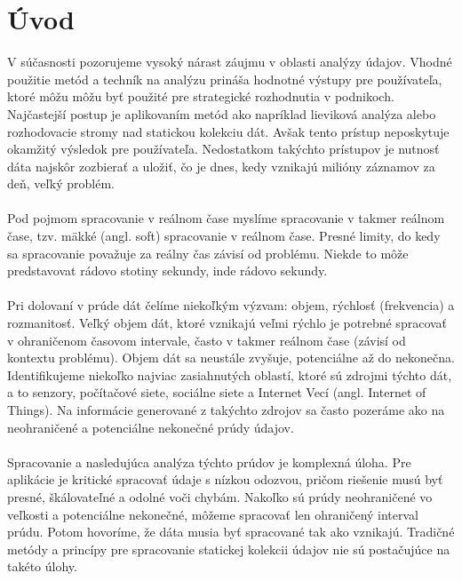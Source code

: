 %

\chapter{Úvod}
V súčasnosti pozorujeme vysoký nárast záujmu v oblasti analýzy údajov. Vhodné použitie metód a techník na analýzu prináša hodnotné výstupy pre používateľa, ktoré môžu môžu byť použité pre strategické rozhodnutia v podnikoch. Najčastejší postup je aplikovaním metód ako napríklad lieviková analýza alebo rozhodovacie stromy nad statickou kolekciu dát. Avšak tento prístup neposkytuje okamžitý výsledok pre používateľa. Nedostatkom takýchto prístupov je nutnosť dáta najskôr zozbierať a uložiť, čo je dnes, kedy vznikajú milióny záznamov za deň, veľký problém.\\
\\
Pod pojmom spracovanie v reálnom čase myslíme spracovanie v takmer reálnom čase, tzv. mäkké (angl. soft) spracovanie v reálnom čase. Presné limity, do kedy sa spracovanie považuje za reálny čas závisí od problému. Niekde to môže predstavovat rádovo stotiny sekundy, inde rádovo sekundy. \\
\\
Pri dolovaní v prúde dát čelíme niekoľkým výzvam: objem,  rýchlosť (frekvencia) a rozmanitosť. Veľký objem dát, ktoré vznikajú veľmi rýchlo je potrebné spracovať v ohraničenom časovom intervale, často v takmer reálnom čase (závisí od kontextu problému). Objem dát sa neustále zvyšuje, potenciálne až do nekonečna. Identifikujeme niekoľko najviac zasiahnutých oblastí, ktoré sú zdrojmi týchto dát, a to senzory, počítačové siete, sociálne siete a Internet Vecí (angl. Internet of Things). Na informácie generované z takýchto zdrojov sa často pozeráme ako na neohraničené a potenciálne nekonečné prúdy údajov. \\
\\
Spracovanie a nasledujúca analýza týchto prúdov je komplexná úloha. Pre aplikácie je kritické spracovať údaje s nízkou odozvou, pričom riešenie musú byť presné, škálovateľné a odolné voči chybám. Nakoľko sú prúdy neohraničené vo veľkosti a potenciálne nekonečné, môžeme spracovať len ohraničený interval prúdu. Potom hovoríme, že dáta musia byť spracované tak ako vznikajú. Tradičné metódy a princípy pre spracovanie statickej kolekcii údajov nie sú postačujúce na takéto úlohy. 